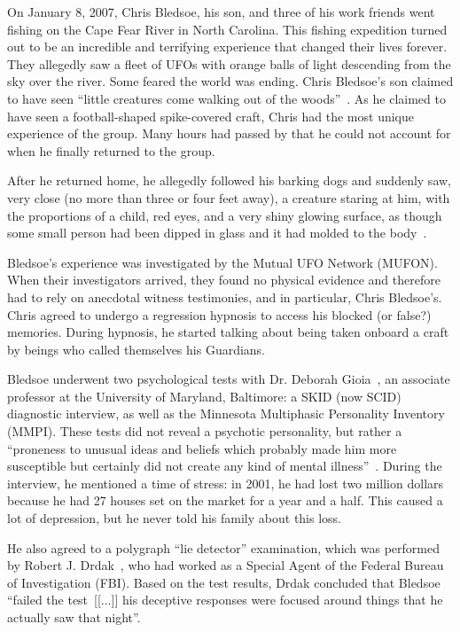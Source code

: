 On January 8, 2007, Chris Bledsoe, his son, and three of his work friends went fishing on the Cape Fear River in North Carolina.
This fishing expedition turned out to be an incredible and terrifying experience that changed their lives forever.
They allegedly saw a fleet of UFOs with orange balls of light descending from the sky over the river.
Some feared the world was ending. Chris Bledsoe's son claimed to have seen
``little creatures come walking out of the woods''~\cite[time=699 s]{UOE2008OctS1E1}.
As he claimed to have seen a football-shaped spike-covered craft,
Chris had the most unique experience of the group.
Many hours had passed by that he could not account for when he finally returned to the group.

After he returned home, he allegedly followed his barking dogs and suddenly saw, very close (no more than three or four feet away), a creature staring at him, with the proportions of a child, red eyes, and a very shiny glowing surface, as though some small person had been dipped in glass and it had molded to the body~\cite{UOE2008OctS1E1}.

Bledsoe's experience was investigated by the Mutual UFO Network (MUFON). When their investigators arrived, they found no physical evidence and therefore had to rely on anecdotal witness testimonies, and in particular, Chris Bledsoe's. Chris agreed to undergo a regression hypnosis to access his blocked (or false?) memories. During hypnosis, he started talking about being taken onboard a craft by beings who called themselves his Guardians.

Bledsoe underwent two psychological tests with Dr. Deborah Gioia~\cite{GioiaMaryland2023Feb}, an associate professor at the University of Maryland, Baltimore: a SKID (now SCID) diagnostic interview, as well as the Minnesota Multiphasic Personality Inventory (MMPI). These tests did not reveal a psychotic personality, but rather a ``proneness to unusual ideas and beliefs which probably made him more susceptible but certainly did not create any kind of mental illness''~\cite{UOE2008OctS1E1}. During the interview, he mentioned a time of stress: in 2001, he had lost two million dollars because he had 27 houses set on the market for a year and a half. This caused a lot of depression, but he never told his family about this loss.

He also agreed to a polygraph ``lie detector'' examination, which was performed by Robert J. Drdak~\cite[time=2099s]{Drdak2023Feb}, who had worked as a Special Agent of the Federal Bureau of Investigation (FBI). Based on the test results, Drdak concluded that Bledsoe ``failed the test~[[$\ldots$]] his deceptive responses were focused around things that he actually saw that night''\cite{UOE2008OctS1E1}.


